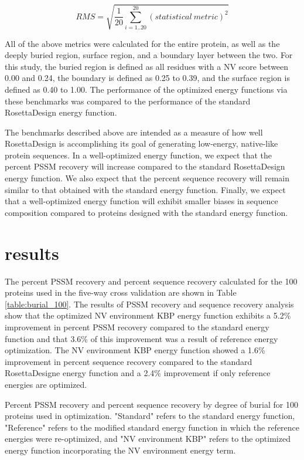 \begin{equation}
RMS=\sqrt{\frac{1}{20}\sum^{20}_{i=1..20}(statistical\ metric)^{2}}
\end{equation}

All of the above metrics were calculated for the entire protein, as well as the deeply buried region, surface region, and a boundary layer between the two.
For this study, the buried region is defined as all residues with a NV score between 0.00 and 0.24, the boundary is defined as 0.25 to 0.39, and the surface region is defined as 0.40 to 1.00.
The performance of the optimized energy functions via these benchmarks was compared to the performance of the standard RosettaDesign energy function.

The benchmarks described above are intended as a measure of how well RosettaDesign is accomplishing its goal of generating low-energy, native-like protein sequences.
In a well-optimized energy function, we expect that the percent PSSM recovery will increase compared to the standard RosettaDesign energy function.
We also expect that the percent sequence recovery will remain similar to that obtained with the standard energy function.
Finally, we expect that a well-optimized energy function will exhibit smaller biases in sequence composition compared to proteins designed with the standard energy function.

\section{results}

The percent PSSM recovery and percent sequence recovery calculated for the 100 proteins used in the five-way cross validation are shown in Table \ref{table:burial_100}.
The results of PSSM recovery and sequence recovery analysis show that the optimized NV environment KBP energy function exhibits a 5.2\% improvement in percent PSSM recovery compared to the standard energy function and that 3.6\% of this improvement was a result of reference energy optimization.
The NV environment KBP energy function showed a 1.6\% improvement in percent sequence recovery compared to the standard RosettaDesigne energy function and a 2.4\% improvement if only reference energies are optimized.  

\begin{table}
\scriptsize
\renewcommand{\tabcolsep}{0.09cm}
\centering

\caption{Percent PSSM recovery and percent sequence recovery by degree of burial for 100 proteins used in optimization. "Standard" refers to the standard energy function, "Reference" refers to the modified standard energy function in which the reference energies were re-optimized, and "NV environment KBP" refers to the optimized energy function incorporating the NV environment energy term.}
\label{table:burial_100}
\end{table}

